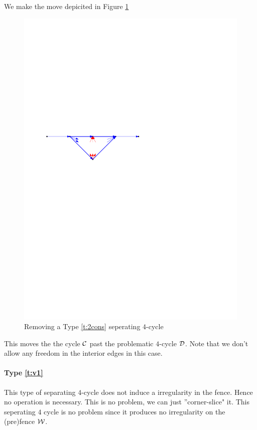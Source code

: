   We make the move depicited in Figure \ref{fig:4c:cycle_b}
  \begin{figure}[h]
    \centering
    \includegraphics[scale=1]{4cycles/img/cycle_b}
    \caption{Removing a Type \ref{t:2cons} seperating $4$-cycle}
    \label{fig:4c:cycle_b}
  \end{figure}

  This moves the the cycle $\mathcal{C}$ past the problematic $4$-cycle $\mathcal{D}$. Note that we don't allow any freedom in the interior edges in this case.

  \paragraph{Type \ref{t:v1}}
  This type of separating $4$-cycle does not induce a irregularity in the fence. Hence no operation is necessary. 
  This is no problem, we can just ''corner-slice" it. This seperating $4$ cycle is no problem since it produces no irregularity on the (pre)fence $\mathcal{W}$.

